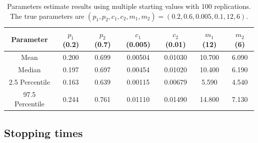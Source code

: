 \documentclass[11pt]{article}
\begin{document}
\begin{table}[!ht]
    \centering
    \begin{tabular}{|c|c|c|c|c|c|c|}
    \hline
         Parameter& $p_1$ (0.2) & $p_2$ (0.7) &$c_1$ (0.005) &$c_2$ (0.01) & $m_1$ (12) & $m_2$ (6) \\
         \hline
         Mean&	0.200&	0.699&	0.00504&	0.01030&	10.700&	6.090\\
         Median&	0.197&	0.697&	0.00454&	0.01020&	10.400&	6.190\\
         2.5 Percentile&	0.163&	0.639&	0.00115&	0.00679&	5.590&	4.540\\
         97.5 Percentile&	0.244&	0.761&	0.01110&	0.01490&	14.800&	7.130\\
         \hline
    \end{tabular}
    \caption{Parameters estimate results using multiple starting values with 100 replications. The true parameters are $(p_1, p_2, c_1 ,c_2, m_1,m_2) = (0.2, 0.6, 0.005,0.1, 12, 6)$.}
    \label{tab:multiple_start_case2}
\end{table}

\newpage

\subsection*{Stopping times}
\end{document}
